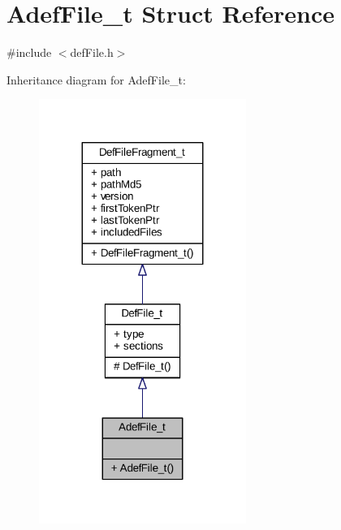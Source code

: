 \hypertarget{struct_adef_file__t}{}\section{Adef\+File\+\_\+t Struct Reference}
\label{struct_adef_file__t}


{\ttfamily \#include $<$def\+File.\+h$>$}



Inheritance diagram for Adef\+File\+\_\+t\+:
\nopagebreak
\begin{figure}[H]
\begin{center}
\leavevmode
\includegraphics[width=191pt]{struct_adef_file__t__inherit__graph}
\end{center}
\end{figure}


